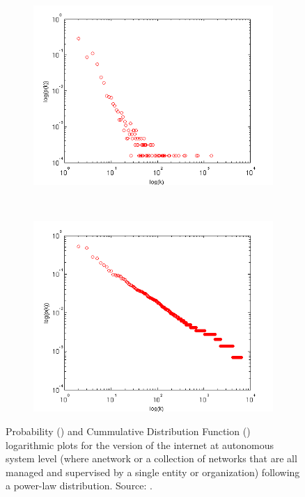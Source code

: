 \documentclass[10pt,a4paper]{article}
\theoremstyle{plain}
\theoremstyle{definition}
\begin{document}
\begin{figure}[H]
	\centering
	\begin{subfigure}[b]{0.38\textwidth}
		\includegraphics[width=\textwidth]{images/noisyplot.png}
		\caption{}
		\label{noisy}
	\end{subfigure}
	~ 
	\begin{subfigure}[b]{0.38\textwidth}
		\includegraphics[width=\textwidth]{images/cfdplot.png}
		\caption{}
		\label{cdf}
	\end{subfigure}
	\caption{ Probability () and Cummulative Distribution Function () logarithmic plots for the version of the internet at autonomous system level (where anetwork or a collection of networks that are all managed and supervised by a single entity or organization) following a power-law distribution.  Source: \cite{frankthesis}. }
	\label{log-plots}
\end{figure}
\end{document}
